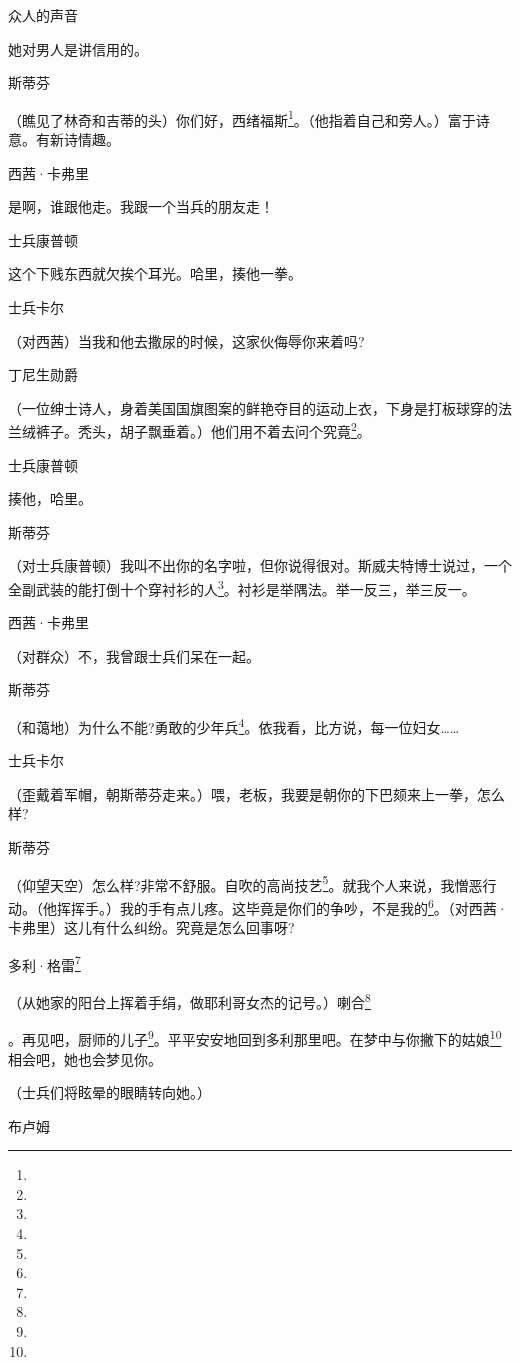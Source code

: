 \par 众人的声音
\par 她对男人是讲信用的。
\par 斯蒂芬
\par （瞧见了林奇和吉蒂的头）你们好，西绪福斯\footnote{}。（他指着自己和旁人。）富于诗意。有新诗情趣。
\par 西茜·卡弗里
\par 是啊，谁跟他走。我跟一个当兵的朋友走！
\par 士兵康普顿
\par 这个下贱东西就欠挨个耳光。哈里，揍他一拳。
\par 士兵卡尔
\par （对西茜）当我和他去撒尿的时候，这家伙侮辱你来着吗?
\par 丁尼生勋爵
\par （一位绅士诗人，身着美国国旗图案的鲜艳夺目的运动上衣，下身是打板球穿的法兰绒裤子。秃头，胡子飘垂着。）他们用不着去问个究竟\footnote{}。
\par 士兵康普顿
\par 揍他，哈里。
\par 斯蒂芬
\par （对士兵康普顿）我叫不出你的名字啦，但你说得很对。斯威夫特博士说过，一个全副武装的能打倒十个穿衬衫的人\footnote{}。衬衫是举隅法。举一反三，举三反一。
\par 西茜·卡弗里
\par （对群众）不，我曾跟士兵们呆在一起。
\par 斯蒂芬
\par （和蔼地）为什么不能?勇敢的少年兵\footnote{}。依我看，比方说，每一位妇女……
\par 士兵卡尔
\par （歪戴着军帽，朝斯蒂芬走来。）喂，老板，我要是朝你的下巴颏来上一拳，怎么样?
\par 斯蒂芬
\par （仰望天空）怎么样?非常不舒服。自吹的高尚技艺\footnote{}。就我个人来说，我憎恶行动。（他挥挥手。）我的手有点儿疼。这毕竟是你们的争吵，不是我的\footnote{}。（对西茜·卡弗里）这儿有什么纠纷。究竟是怎么回事呀?
\par 多利·格雷\footnote{}
\par （从她家的阳台上挥着手绢，做耶利哥女杰的记号。）喇合\footnote{}
\par 。再见吧，厨师的儿子\footnote{}。平平安安地回到多利那里吧。在梦中与你撇下的姑娘\footnote{}相会吧，她也会梦见你。
\par （士兵们将眩晕的眼睛转向她。）
\par 布卢姆
